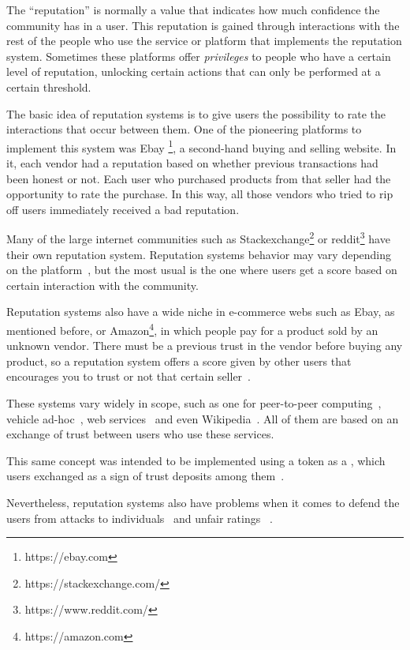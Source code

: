 The ``reputation'' is normally a value that indicates how much confidence the
community has in a user. This reputation is gained through interactions with the
rest of the people who use the service or platform that implements the
reputation system. Sometimes these platforms offer \emph{privileges} to people
who have a certain level of reputation, unlocking certain actions that can only
be performed at a certain threshold.

The basic idea of reputation systems is to give users the possibility to rate
the interactions that occur between them. One of the pioneering platforms to
implement this system was Ebay \footnote{https://ebay.com}, a second-hand buying
and selling website. In it, each vendor had a reputation based on whether
previous transactions had been honest or not. Each user who purchased products
from that seller had the opportunity to rate the purchase. In this way, all
those vendors who tried to rip off users immediately received a bad reputation.

Many of the large internet communities such as
Stackexchange\footnote{https://stackexchange.com/} or
reddit\footnote{https://www.reddit.com/} have their own reputation system.
Reputation systems behavior may vary depending on the
platform~\cite{josang2002beta}, but the most usual is the one where users get a
score based on certain interaction with the community.

Reputation systems also have a wide niche in e-commerce webs such as Ebay, as
mentioned before, or Amazon\footnote{https://amazon.com}, in
which people pay for a product sold by an unknown vendor. There must be a
previous trust in the vendor before buying any product, so a reputation system
offers a score given by other users that encourages you to trust or not that
certain seller~\cite{resnick2002trust}.

These systems vary widely in scope, such as one for peer-to-peer
computing~\cite{zhou2007powertrust}, vehicle ad-hoc~\cite{dotzer2005vars}, web
services~\cite{moore2008reputation} and even Wikipedia~\cite{adler2007content}.
All of them are based on an exchange of trust between users who use these
services.

This same concept was intended to be implemented using a
token as a , which users exchanged as a sign of trust deposits among
them~\cite{sharples2016blockchain}.

Nevertheless, reputation systems also have problems when it comes to defend the
users from attacks to individuals~\cite{hoffman2009survey} and unfair ratings
~\cite{whitby2004filtering}.

